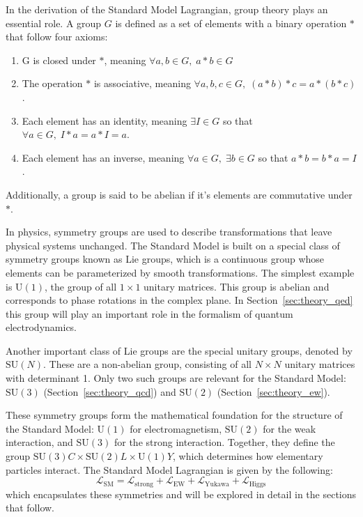 In the derivation of the Standard Model Lagrangian, group theory plays an essential role. A group $G$ is defined as a set of elements with a binary operation $\ast$ that follow four axioms:
\begin{enumerate}
  \item G is closed under $\ast$, meaning $\forall a, b \in G, \; a \ast b \in G$  
  \item The operation $\ast$ is associative, meaning $\forall a, b, c \in G, \; (a \ast b) \ast c = a \ast (b \ast c)$.
  \item Each element has an identity, meaning $\exists I \in G$ so that $\forall a \in G, \; I \ast a = a \ast I = a$.
  \item Each element has an inverse, meaning $\forall a \in G, \; \exists b \in G$ so that $a \ast b = b \ast a = I$.
\end{enumerate}
Additionally, a group is said to be abelian if it's elements are commutative under $\ast$. 

In physics, symmetry groups are used to describe transformations that leave physical systems unchanged. The Standard Model is built on a special class of symmetry groups known as Lie groups, which is a continuous group whose elements can be parameterized by smooth transformations. The simplest example is $\mathrm{U}(1)$, the group of all $1 \times 1$ unitary matrices. This group is abelian and corresponds to phase rotations in the complex plane. In Section~\ref{sec:theory_qed} this group will play an important role in the formalism of quantum electrodynamics. 

Another important class of Lie groups are the special unitary groups, denoted by $\mathrm{SU}(N)$. These are a non-abelian group, consisting of all $N \times N$ unitary matrices with determinant 1. Only two such groups are relevant for the Standard Model: $\mathrm{SU}(3)$ (Section~\ref{sec:theory_qcd}) and $\mathrm{SU}(2)$ (Section~\ref{sec:theory_ew}).

These symmetry groups form the mathematical foundation for the structure of the Standard Model: $\mathrm{U}(1)$ for electromagnetism, $\mathrm{SU}(2)$ for the weak interaction, and $\mathrm{SU}(3)$ for the strong interaction. Together, they define the group $\mathrm{SU}(3)C \times \mathrm{SU}(2)L \times \mathrm{U}(1)Y$, which determines how elementary particles interact. The Standard Model Lagrangian is given by the following:
\begin{equation}
  \mathcal{L}_{\mathrm{SM}} = \mathcal{L}_{\mathrm{strong}} + \mathcal{L}_{\mathrm{EW}} + \mathcal{L}_{\mathrm{Yukawa}} + \mathcal{L}_{\mathrm{Higgs}}
  \label{eq:sm_lagrangian}
\end{equation}
which encapsulates these symmetries and will be explored in detail in the sections that follow.
